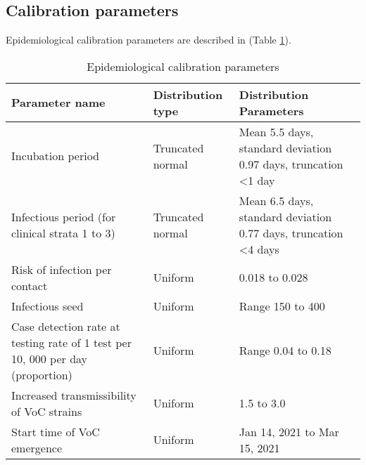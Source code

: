 \subsection{Calibration parameters}
Epidemiological calibration parameters are described in (Table \ref{tab:calibration_params}). 
\vspace{-24mm}
\begin{table}[htp]

    \begin{tabular}{| p{4.4cm} | p{4.4cm} | p{5cm} |}
        \hline
        \textbf{Parameter name} & \textbf{Distribution type} & \textbf{Distribution Parameters} \\
        \hline
        Incubation period & Truncated normal & Mean 5.5 days, standard 			        deviation 0.97 days, truncation \textless 1 day \\
      \hline
      Infectious period (for clinical strata 1 to 3) & Truncated normal &         	  Mean 6.5 days, standard deviation 0.77 days, truncation \textless 4 		      days \\
      \hline
      Risk of infection per contact & Uniform & 0.018 to 0.028\\
      \hline
      Infectious seed & Uniform & Range 150 to 400 \\
      \hline
   	  Case detection rate at testing rate of 1 test per 10, 000 per day 		      (proportion) & Uniform 	      & Range 0.04 to 0.18 \\
   	  \hline
   	  Increased transmissibility of VoC strains  & Uniform & 1.5 to 3.0\\
      \hline
      Start time of VoC emergence  & Uniform & Jan 14, 2021 to Mar 15, 2021 \\
      \hline
    \end{tabular}
    \caption{Epidemiological calibration parameters}
    \label{tab:calibration_params}
\end{table}
\clearpage
